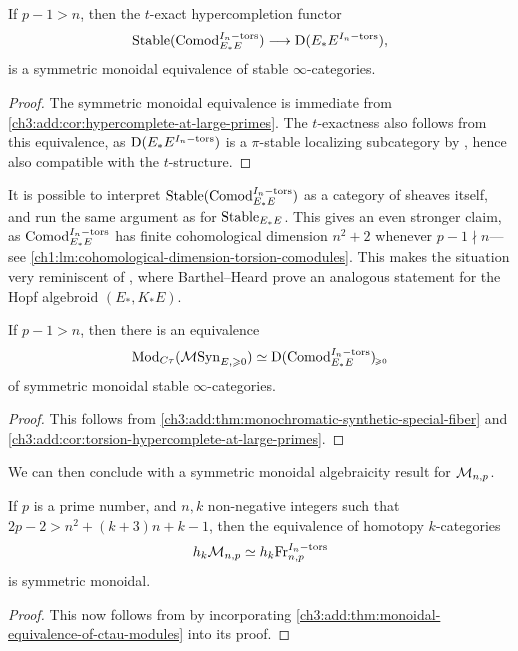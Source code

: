 \begin{corollary}
    \label{ch3:add:cor:torsion-hypercomplete-at-large-primes}
    If $p-1> n$, then the $t$-exact hypercompletion functor
    \[\mathrm{Stable}(\mathrm{Comod}_{E_*E}^{I_n-\mathrm{tors}}) \longrightarrow \mathrm{D}(E_*E^{I_n-\mathrm{tors}}),\]
    is a symmetric monoidal equivalence of stable $\infty$-categories.  
\end{corollary}
\begin{proof}
    The symmetric monoidal equivalence is immediate from \cref{ch3:add:cor:hypercomplete-at-large-primes}. The $t$-exactness also follows from this equivalence, as $\mathrm{D}(E_*E^{I_n-\mathrm{tors}})$ is a $\pi$-stable localizing subcategory by \cite[3.7(2)]{barthel-heard-valenzuela_2020}, hence also compatible with the $t$-structure. 
\end{proof}

\begin{remark}
    It is possible to interpret $\mathrm{Stable}(\mathrm{Comod}_{E_*E}^{I_n-\mathrm{tors}})$ as a category of sheaves itself, and run the same argument as for $\mathrm{Stable}_{E_*E}$. This gives an even stronger claim, as $\mathrm{Comod}_{E_*E}^{I_n-\mathrm{tors}}$ has finite cohomological dimension $n^2+2$ whenever $p-1\nmid n$---see \cref{ch1:lm:cohomological-dimension-torsion-comodules}. This makes the situation very reminiscent of \cite[4.7]{barthel-heard_2018}, where Barthel--Heard prove an analogous statement for the Hopf algebroid $(E_*, K_*E)$. 
\end{remark}

\begin{theorem}
    \label{ch3:add:thm:monoidal-equivalence-of-ctau-modules}
    If $p-1>n$, then there is an equivalence 
    \[\mathrm{Mod}_{C\tau}(\mathcal{M}\mathrm{Syn}_{E, \geqslant 0}) \simeq \mathrm{D}(\mathrm{Comod}_{E_*E}^{I_n-\mathrm{tors}})_{\hspace{-1pt}\scriptscriptstyle\geqslant 0}\]
    of symmetric monoidal stable $\infty$-categories. 
\end{theorem}
\begin{proof}
    This follows from \cref{ch3:add:thm:monochromatic-synthetic-special-fiber} and \cref{ch3:add:cor:torsion-hypercomplete-at-large-primes}. 
\end{proof}

We can then conclude with a symmetric monoidal algebraicity result for $\mathcal{M}_{n,p}$. 

\begin{theorem}
    \label{ch3:add:thm:monochromatic-monoidally-algebraic}
    If $p$ is a prime number, and $n, k$ non-negative integers such that $2p-2>n^2+(k+3)n+k-1$, then the equivalence of homotopy $k$-categories
    \[h_k \mathcal{M}_{n,p}\simeq h_k \mathrm{Fr}_{n,p}^{I_n-\mathrm{tors}}\]
    is symmetric monoidal. 
\end{theorem}
\begin{proof}
    This now follows from \cite[Theorem H]{barkan_2023} by incorporating \cref{ch3:add:thm:monoidal-equivalence-of-ctau-modules} into its proof. 
\end{proof}

